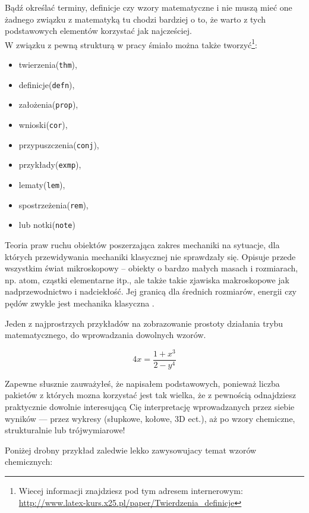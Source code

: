 Bądź określać terminy, definicje czy wzory matematyczne i nie muszą mieć one żadnego związku z matematyką tu chodzi bardziej o to, że warto z tych podstawowych elementów korzystać jak najcześciej.\\

W związku z pewną strukturą w pracy śmiało można także tworzyć\footnote{Wiecej informacji znajdziesz pod tym adresem internerowym: \url{http://www.latex-kurs.x25.pl/paper/Twierdzenia_definicje}}: 

\begin{itemize}
\item twierzenia(\texttt{thm}), 
\item definicje(\texttt{defn}), 
\item założenia(\texttt{prop}), 
\item wnioski(\texttt{cor}), 
\item przypuszczenia(\texttt{conj}), 
\item przykłady(\texttt{exmp}), 
\item lematy(\texttt{lem}),
\item spostrzeżenia(\texttt{rem}),
\item lub notki(\texttt{note})
\end{itemize}

\begin{defn}
Teoria praw ruchu obiektów poszerzająca zakres mechaniki na sytuacje, dla których przewidywania mechaniki klasycznej nie sprawdzały się. Opisuje przede wszystkim świat mikroskopowy – obiekty o bardzo małych masach i rozmiarach, np. atom, cząstki elementarne itp., ale także takie zjawiska makroskopowe jak nadprzewodnictwo i nadciekłość. Jej granicą dla średnich rozmiarów, energii czy pędów zwykle jest mechanika klasyczna \parencite{url:wiki-mechanika-kwantowa}.
\end{defn}

\noindent Jeden z najprostrzych przykładów na zobrazowanie prostoty działania trybu matematycznego, do wprowadzania dowolnych wzorów.

$$
4 x = \frac{1+x^3}{2-y^4} 
$$

Zapewne słusznie zauważyłeś, że napisałem podstawowych, ponieważ liczba pakietów z których mozna korzystać jest tak wielka, że z pewnością odnajdziesz praktycznie dowolnie interesującą Cię interpretację wprowadzanych przez siebie wyników --- przez wykresy (słupkowe, kołowe, 3D ect.), aż po wzory chemiczne, strukturalnie lub trójwymiarowe!

Poniżej drobny przykład zaledwie lekko zawysowujacy temat wzorów chemicznych: 
\vspace{.5cm}
\begin{center}
\end{center}
